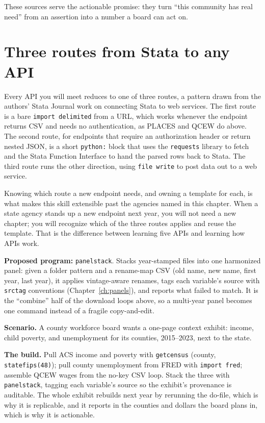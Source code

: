 \documentclass[
    a4paper,
    fontsize=10pt,
    twoside=true,
    numbers=noenddot,
]{kaobook}
\newcounter{appliedexample}
\newenvironment{appliedexample}[1][]{%
    \refstepcounter{appliedexample}%
    \begin{appliedexamplebox}[frametitle={Applied Example~\theappliedexample.~~#1}]%
}{%
    \end{appliedexamplebox}%
}
\begin{document}
These sources serve the actionable promise: they turn \enquote{this community has real need} from an assertion into a number a board can act on.

\section{Three routes from Stata to any API}\label{sec:threeroutes}
Every API you will meet reduces to one of three routes, a pattern drawn from the authors' Stata Journal work on connecting Stata to web services. The first route is a bare \texttt{import delimited} from a URL, which works whenever the endpoint returns CSV and needs no authentication, as PLACES and QCEW do above. The second route, for endpoints that require an authorization header or return nested JSON, is a short \texttt{python:} block that uses the \texttt{requests} library to fetch and the Stata Function Interface to hand the parsed rows back to Stata. The third route runs the other direction, using \texttt{file write} to post data out to a web service.

Knowing which route a new endpoint needs, and owning a template for each, is what makes this skill extensible past the agencies named in this chapter. When a state agency stands up a new endpoint next year, you will not need a new chapter; you will recognize which of the three routes applies and reuse the template. That is the difference between learning five APIs and learning how APIs work.

\begin{kaobox}[frametitle=Ado-file Idea: \texttt{panelstack}]
\textbf{Proposed program:} \texttt{panelstack}. Stacks year-stamped files into one harmonized panel: given a folder pattern and a rename-map CSV (old name, new name, first year, last year), it applies vintage-aware renames, tags each variable's source with \texttt{srctag} conventions (Chapter~\ref{ch:panels}), and reports what failed to match. It is the \enquote{combine} half of the download loops above, so a multi-year panel becomes one command instead of a fragile copy-and-edit.
\end{kaobox}

\begin{appliedexample}[A Texas county panel from three APIs]
\textbf{Scenario.} A county workforce board wants a one-page context exhibit: income, child poverty, and unemployment for its counties, 2015--2023, next to the state.

\medskip
\textbf{The build.} Pull ACS income and poverty with \texttt{getcensus} (county, \texttt{statefips(48)}); pull county unemployment from FRED with \texttt{import fred}; assemble QCEW wages from the no-key CSV loop. Stack the three with \texttt{panelstack}, tagging each variable's source so the exhibit's provenance is auditable. The whole exhibit rebuilds next year by rerunning the do-file, which is why it is replicable, and it reports in the counties and dollars the board plans in, which is why it is actionable.
\end{appliedexample}
\end{document}
